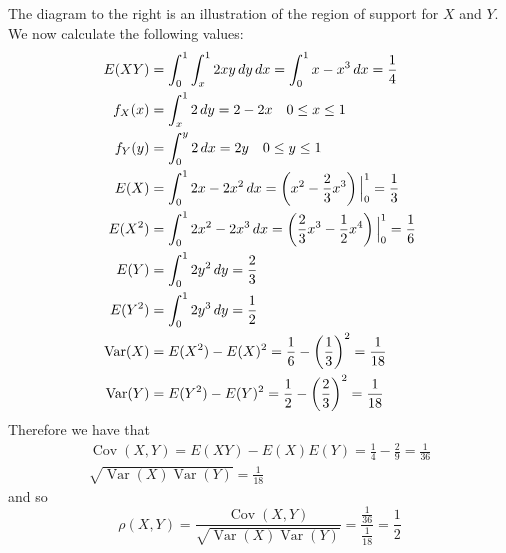 \documentclass[notoc,notitlepage]{tufte-book}
\DeclareMathOperator{\Var}{Var }
\DeclareMathOperator{\Cov}{Cov }
\begin{document}
\begin{solution}
    The diagram to the right is an illustration of the region of support for $X$ and $Y$.
    We now calculate the following values:
    \begin{align*}
      E(XY)  &= \int_{0}^{1} \int_{x}^{1} 2xy \dif{y} \dif{x} = \int_{0}^{1} x - x^3 \dif{x} = \frac{1}{4} \\
      f_X(x) &= \int_{x}^{1} 2 \dif{y} = 2 - 2x \quad 0 \leq x \leq 1 \\
      f_Y(y) &= \int_{0}^{y} 2 \dif{x} = 2y \quad 0 \leq y \leq 1 \\
      E(X)   &= \int_{0}^{1} 2x - 2x^2 \dif{x} = \left( x^2 - \frac{2}{3}x^3 \right)\at{0}{1} = \frac{1}{3} \\
      E(X^2) &= \int_{0}^{1} 2x^2 - 2x^3 \dif{x} = \left( \frac{2}{3}x^3 - \frac{1}{2}x^4 \right)\at{0}{1} = \frac{1}{6} \\
      E(Y)   &= \int_{0}^{1} 2y^2 \dif{y} = \frac{2}{3} \\
      E(Y^2) &= \int_{0}^{1} 2y^3 \dif{y} = \frac{1}{2} \\
      \Var(X)&= E(X^2) - E(X)^2 = \frac{1}{6} - \left( \frac{1}{3} \right)^2 = \frac{1}{18} \\
      \Var(Y)&= E(Y^2) - E(Y)^2 = \frac{1}{2} - \left( \frac{2}{3} \right)^2 = \frac{1}{18}
    \end{align*}
    Therefore we have that
    \begin{gather*}
      \Cov(X, Y) = E(XY) - E(X)E(Y) = \frac{1}{4} - \frac{2}{9} = \frac{1}{36} \\
      \sqrt{\Var(X) \Var(Y)} = \frac{1}{18}
    \end{gather*}
    and so
    \begin{equation*}
      \rho(X, Y) = \frac{\Cov(X, Y)}{\sqrt{\Var(X) \Var(Y)}} = \frac{\frac{1}{36}}{\frac{1}{18}} = \frac{1}{2}
    \end{equation*}
\end{solution}
\end{document}
